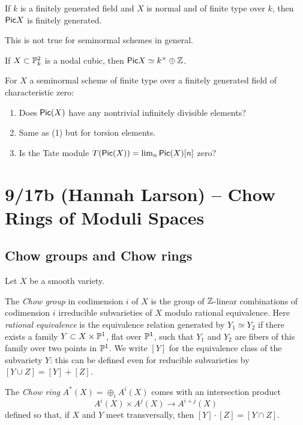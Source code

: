 \documentclass{amsart}
\begin{document}
\begin{thm}
	If $k$ is a finitely generated field and $X$ is normal and of finite type over $k$, then $\mathsf{Pic} X$ is finitely generated.
\end{thm}

This is not true for seminormal schemes in general.

\begin{ex}
	If $X \subset \mathbb{P}^2_k$ is a nodal cubic, then $\mathsf{Pic} X \simeq k^\times \oplus \mathbb{Z}$.
\end{ex}

\begin{qn}
	For $X$ a seminormal scheme of finite type over a finitely generated field of characteristic zero:
	\begin{enumerate}
		\item Does $\mathsf{Pic}(X)$ have any nontrivial infinitely divisible elements?
		\item Same as (1) but for torsion elements.
		\item Is the Tate module $T(\mathsf{Pic}(X)) = \lim_n \mathsf{Pic}(X)[n]$ zero?
	\end{enumerate}
\end{qn}

\section{9/17b (Hannah Larson) -- Chow Rings of Moduli Spaces}

\subsection{Chow groups and Chow rings}

Let $X$ be a smooth variety.

\begin{dfn}
	The \emph{Chow group} in codimension $i$ of $X$ is the group of $\mathbb{Z}$-linear combinations of codimension $i$ irreducible subvarieties of $X$ modulo rational equivalence.
	Here \emph{rational equivalence} is the equivalence relation generated by $Y_1 \simeq Y_2$ if there exists a family $Y \subset X \times \mathbb{P}^1$, flat over $\mathbb{P}^1$, such that $Y_1$ and $Y_2$ are fibers of this family over two points in $\mathbb{P}^1$.
	We write $[Y]$ for the equivalence class of the subvariety $Y$: this can be defined even for reducible subvarieties by $[Y \cup Z] = [Y] + [Z]$.
\end{dfn}

\begin{dfn}
	The \emph{Chow ring} $A^*(X) = \oplus_i A^i(X)$ comes with an intersection product
	\[
		A^i(X) \times A^j(X) \to A^{i+j}(X)
	\]
	defined so that, if $X$ and $Y$ meet transversally, then $[Y] \cdot [Z] = [Y \cap Z]$.
\end{dfn}
\end{document}
